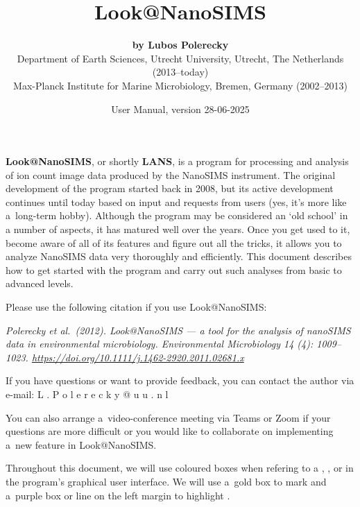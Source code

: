 \documentclass[a4paper, 11pt]{article}
\title{\LARGE \bf Look@NanoSIMS}
\author{{\large\bf by Lubos Polerecky}\\[6mm]
{\small Department of Earth Sciences, Utrecht University, Utrecht, The Netherlands (2013--today)} \\%
{\small Max-Planck Institute for Marine Microbiology, Bremen, Germany (2002--2013)}\\[3mm]}
\date{User Manual, version 28-06-2025}
\newcommand{\ttt}[1]{\textsf{#1}}
\newcounter{step}
\begin{document}
\maketitle
\reversemarginpar 

\textbf{Look@NanoSIMS}, or shortly \textbf{LANS}, is a program for processing and analysis of ion count image data produced by the NanoSIMS instrument. The original development of the program started back in 2008, but its active development continues until today based on input and requests from users (yes, it's more like a~long-term hobby). Although the program may be considered an `old school' in a number of aspects, it has matured well over the years. Once you get used to it, become aware of all of its features and figure out all the tricks, it allows you to analyze NanoSIMS data very thoroughly and efficiently. This document describes how to get started with the program and carry out such analyses from basic to advanced levels. 
\tcbe

\vskip2mm

Please use the following citation if you use Look@NanoSIMS:
\begin{center}
\begin{minipage}{0.93\textwidth}
\textsl{\small Polerecky et al.~(2012). Look@NanoSIMS --- a tool for the analysis of nanoSIMS data in environmental microbiology. \textit{Environmental Microbiology} 14 (4): 1009--1023. \url{ https://doi.org/10.1111/j.1462-2920.2011.02681.x}}
\end{minipage}
\end{center}
\tcbe

\vskip2mm

If you have questions or want to provide feedback, you can contact the author via e-mail: 
\vskip0.5mm
\hspace{0.5cm} \ttt{L . P o l e r e c k y @ u u . n l}

\vskip1mm\noindent You can also arrange a~video-conference meeting via Teams or Zoom if your questions are more difficult or you would like to collaborate on implementing a~new feature in Look@NanoSIMS.
\tcbe

\vskip2mm

Throughout this document, we will use coloured boxes when refering to a , ,  or  in the program's graphical user interface. We will use a~gold box to mark  and a~purple box or line on the left margin to highlight .
\tcbe
\end{document}
